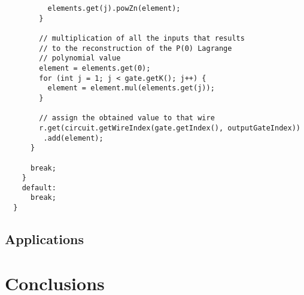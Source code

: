 \documentclass[12pt]{article}
\newcommand\blankpage{%
    \null
    \thispagestyle{empty}%
    \addtocounter{page}{-1}%
    \newpage}
\begin{document}
\begin{lstlisting}
          elements.get(j).powZn(element);
        }

        // multiplication of all the inputs that results
        // to the reconstruction of the P(0) Lagrange
        // polynomial value
        element = elements.get(0);
        for (int j = 1; j < gate.getK(); j++) {
          element = element.mul(elements.get(j));
        }

        // assign the obtained value to that wire
        r.get(circuit.getWireIndex(gate.getIndex(), outputGateIndex))
         .add(element);
      }

      break;
    }
    default:
      break;
  }

\end{lstlisting}

\subsection{Applications}

\section{Conclusions}

\pagebreak

\blankpage
\end{document}
